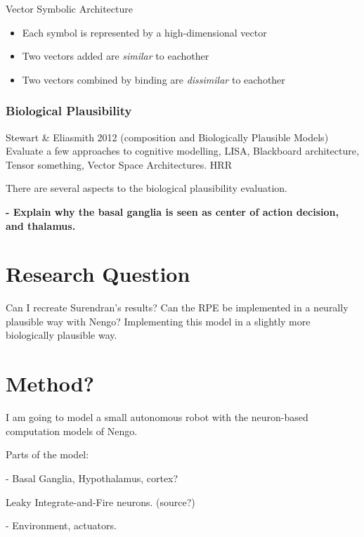 \documentclass[12pt]{article}
\begin{document}
Vector Symbolic Architecture
\begin{itemize}
\item Each symbol is represented by a high-dimensional vector
\item Two vectors added are \emph{similar} to eachother
\item Two vectors combined by binding are \emph{dissimilar} to eachother
\end{itemize}

\subsubsection{Biological Plausibility}

Stewart \& Eliasmith 2012 (composition and Biologically Plausible Models)
Evaluate a few approaches to cognitive modelling, LISA, Blackboard architecture, Tensor something, Vector Space Architectures. HRR

There are several aspects to the biological plausibility evaluation. 



\textbf{\color{red}
- Explain why the basal ganglia is seen as center of action decision, and thalamus.} 





\section{Research Question}
Can I recreate Surendran's results? Can the RPE be implemented in a neurally plausible way with Nengo?
Implementing this model in a slightly more biologically plausible way.



\section{Method?}

I am going to model a small autonomous robot with the neuron-based computation models of Nengo.

Parts of the model:

- Basal Ganglia, Hypothalamus, cortex? 

Leaky Integrate-and-Fire neurons. 
(source?)

- Environment, actuators.  
\end{document}

